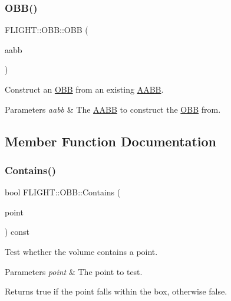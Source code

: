 \subsubsection{\texorpdfstring{O\+B\+B()}{OBB()}}
{\footnotesize\ttfamily F\+L\+I\+G\+H\+T\+::\+O\+B\+B\+::\+O\+BB (\begin{DoxyParamCaption}\item[{const \hyperlink{class_f_l_i_g_h_t_1_1_a_a_b_b}{A\+A\+BB} \&}]{aabb }\end{DoxyParamCaption})}



Construct an \hyperlink{class_f_l_i_g_h_t_1_1_o_b_b}{O\+BB} from an existing \hyperlink{class_f_l_i_g_h_t_1_1_a_a_b_b}{A\+A\+BB}. 


\begin{DoxyParams}{Parameters}
{\em aabb} & The \hyperlink{class_f_l_i_g_h_t_1_1_a_a_b_b}{A\+A\+BB} to construct the \hyperlink{class_f_l_i_g_h_t_1_1_o_b_b}{O\+BB} from. \\
\hline
\end{DoxyParams}


\subsection{Member Function Documentation}
\mbox{\label{class_f_l_i_g_h_t_1_1_o_b_b_a07b87a6c611a251e3dd98ff83b72fe01}} 
\subsubsection{\texorpdfstring{Contains()}{Contains()}}
{\footnotesize\ttfamily bool F\+L\+I\+G\+H\+T\+::\+O\+B\+B\+::\+Contains (\begin{DoxyParamCaption}\item[{const glm\+::vec3 \&}]{point }\end{DoxyParamCaption}) const}



Test whether the volume contains a point. 


\begin{DoxyParams}{Parameters}
{\em point} & The point to test. \\
\hline
\end{DoxyParams}
\begin{DoxyReturn}{Returns}
true if the point falls within the box, otherwise false. 
\end{DoxyReturn}
\mbox{\label{class_f_l_i_g_h_t_1_1_o_b_b_a064497f85c7d383062f7011dd2888074}} 
